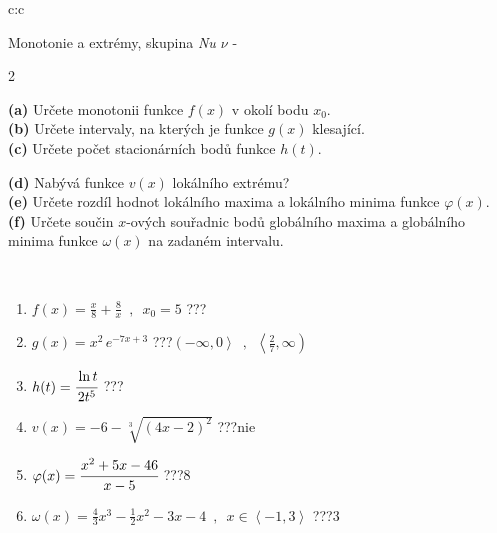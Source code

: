 \documentclass[10pt]{report}
\begin{document}
\newpage
\thispagestyle{empty}
\begin{tabular}{c:c}
\begin{minipage}[c][104.5mm][t]{0.5\linewidth}
\begin{center}
\vspace{7mm}
{\huge Monotonie a extrémy, skupina \textit{Nu $\nu$} -}\\[5mm]
\begin{minipage}{0.95\linewidth}
\begin{center}
{\small \begin{multicols}{2} \raggedright
\textbf{(a)} Určete monotonii funkce \(f(x)\) v okolí bodu \(x_0\). \\[1mm]
\textbf{(b)} Určete intervaly, na kterých je funkce \(g(x)\) klesající. \\[1mm]
\textbf{(c)} Určete počet stacionárních bodů funkce \(h(t)\). \par \columnbreak
\textbf{(d)} Nabývá funkce \(v(x)\) lokálního extrému? \\[1mm]
\textbf{(e)} Určete rozdíl hodnot lokálního maxima a lokálního minima funkce \(\varphi(x)\). \\[1mm]
\textbf{(f)} Určete součin \(x\)-ových souřadnic bodů globálního maxima a globálního minima funkce \(\omega(x)\) na zadaném intervalu. \\[1mm]
\end{multicols}
}
\end{center}
\end{minipage}
\\[4mm]
\begin{minipage}{0.79\linewidth}
\begin{center}
\begin{varwidth}{\linewidth}
\begin{enumerate}
\normalsize
\item $f(x)=\frac{x}{8}+\frac{8}{x} \enspace , \enspace x_0=5$\quad \dotfill\; ???\;\dotfill \quad {}
\item $g(x)=x^2\, e^{-7x+3}$\quad \dotfill\; ???\;\dotfill \quad $\left(-\infty , 0\right\rangle\enspace , \enspace \left\langle\frac{2}{7} , \infty\right)$
\item $h(t)=\cfrac{\ln t}{2t^5}$\quad \dotfill\; ???\;\dotfill {}
\item $v(x)=-6-\sqrt[3]{(4x-2)^2}$\quad \dotfill\; ???\;\dotfill \quad $\text{nie}$
\item $\varphi(x)=\cfrac{x^2+5x-46}{x-5}$\quad \dotfill\; ???\;\dotfill \quad $8$
\item $\omega(x)=\frac{4}{3}x^3-\frac{1}{2}x^2-3x-4 \enspace , \enspace x\in\left\langle-1 , 3\right\rangle$\quad \dotfill\; ???\;\dotfill \quad $3$

\end{enumerate}
\end{varwidth}
\end{center}
\end{minipage}
\end{center}
\end{minipage}
\end{tabular}
\end{document}
